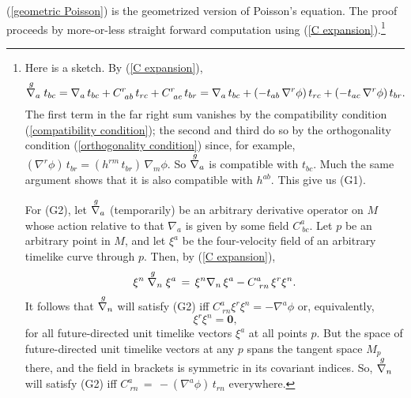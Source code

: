 \documentclass [12] {article}
\theoremstyle{plain}
\numberwithin{figure}{subsection}
\numberwithin{proposition}{subsection}
\begin{document}
(\ref{geometric Poisson}) is the geometrized version of Poisson's equation. The proof proceeds by more-or-less straight forward computation using (\ref{C expansion}).\footnote{Here is a sketch. By (\ref{C expansion}),
\begin{equation*}
\stackrel{g \hspace{.4em}}{\nabla_a}  t_{bc} = 
\nabla_a \, t_{bc} + C^r_{\ ab}\, t_{rc} + C^r_{\ ac}\, t_{br} = \nabla_a \, t_{bc}  +  ( -t_{ab} \, \nabla^r \phi)\, t_{rc} + ( -t_{ac} \, \nabla^r \phi)\, t_{br}. 
\end{equation*}
The first term in the far right sum vanishes by the compatibility condition (\ref{compatibility condition}); the second and third do so by the orthogonality condition (\ref{orthogonality condition}) since, for example,  $(\nabla^r \phi)\, t_{br} = (h^{rm} \,  t_{br}) \,\nabla_m \phi$.  So $\stackrel{g \hspace{.4em}}{\nabla_a}$ is compatible with $t_{bc}$. Much the same argument shows that it is also compatible with $h^{ab}$. This give us (G1). 

For (G2), let  $\stackrel{g \hspace{.4em}}{\nabla_a}$ (temporarily) be an arbitrary derivative operator on $M$ whose action relative to that $\nabla_a$ is given by some field $C^a_{\ bc}$.  Let $p$ be an arbitrary point in $M$, and let $\xi^a$ be the four-velocity field of an arbitrary timelike curve through $p$. Then, by (\ref{C expansion}), 
\begin{equation*}
\xi^n \stackrel{g \hspace{.4em}}{\nabla_n} \xi^a \,  = \,  \xi^n \nabla_n  \, \xi^a - C^a_{\ rn} \, \xi^r  \xi^n.  
\end{equation*}
It follows that $\stackrel{g \hspace{.4em}}{\nabla_n}$ will satisfy (G2) iff    $C^a_{\ rn} \xi^r  \xi^n  = -\nabla^a \phi$ or, equivalently, 
\begin{equation*}
[C^a_{\ rn} \,  + (\nabla^a \phi) \, t_{rn}] \,  \xi^r   \xi^n  = \mathbf{0}, 
\end{equation*}
for all future-directed unit timelike vectors $\xi^a$ at all points $p$.  But the space of  future-directed unit timelike vectors at any $p$ spans the tangent space $M_p$ there, and the field in brackets is symmetric in its covariant indices.  So, $\stackrel{g \hspace{.4em}}{\nabla_n}$ will satisfy (G2) iff  $C^a_{\ rn} \,  = \,   -(\nabla^a \phi) \, t_{rn}$  everywhere.

}
\end{document}
